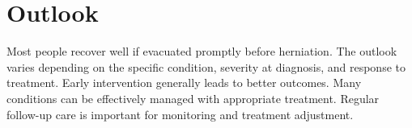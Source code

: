 \section{Outlook}
Most people recover well if evacuated promptly before herniation. The outlook varies depending on the specific condition, severity at diagnosis, and response to treatment. Early intervention generally leads to better outcomes. Many conditions can be effectively managed with appropriate treatment. Regular follow-up care is important for monitoring and treatment adjustment.
